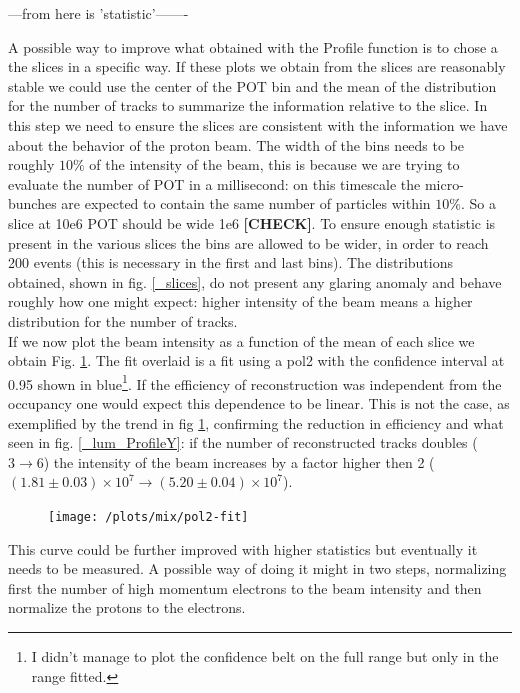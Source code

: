 \documentclass[12pt,a4paper,openright, oneside, titlepage]{book} %
\begin{document}
\vspace{2cm}
---from here is 'statistic'-------
\vspace{2cm}

\noindent A possible way to improve what obtained with the Profile function is to chose a the slices in a specific way. If these plots we obtain from the slices are reasonably stable we could use the center of the POT bin and the mean of the distribution for the number of tracks to summarize the information relative to the slice. 
In this step we need to ensure the slices are consistent with the information we have about the behavior of the proton beam.
The width of the bins needs to be roughly $10\%$ of the intensity of the beam, this is because we are trying to evaluate the number of POT in a millisecond: on this timescale the micro-bunches are expected to contain the same number of particles within $10\%$. 
So a slice at 10e6 POT should be wide 1e6 \textbf{[CHECK]}. 
To ensure enough statistic is present in the various slices the bins are allowed to be wider, in order to reach 200 events (this is necessary in the first and last bins).
The distributions obtained, shown in fig. \ref{_slices}, do not present any glaring anomaly and behave roughly how one might expect: higher intensity of the beam means a higher distribution for the number of tracks.\\

\noindent If we now plot the beam intensity as a function of the mean of each slice we obtain Fig. \ref{_pol2-fit}. 
The fit overlaid is a fit using a pol2 with the confidence interval at 0.95 shown in blue\footnote{I didn't manage to plot the confidence belt on the full range but only in the range fitted.}. 
If the efficiency of reconstruction was independent from the occupancy one would expect this dependence to be linear. 
This is not the case, as exemplified by the trend in fig \ref{_pol2-fit}, confirming the reduction in efficiency and what seen in fig. \ref{_lum_ProfileY}: if the number of reconstructed tracks doubles ($3\rightarrow6$) the intensity of the beam increases by a factor higher then 2 ($(1.81 \pm 0.03)\times 10^7 \rightarrow (5.20 \pm 0.04)\times 10^7$).

\begin{figure}[!htb]
\centering
\texttt{[image: /plots/mix/pol2-fit]}
\caption[Mean of the gaussian fit for of tracks per beam intensity]
{}
\label{_pol2-fit}
\end{figure}

\noindent This curve could be further improved with higher statistics but eventually it needs to be measured.
A possible way of doing it might in two steps, normalizing first the number of high momentum electrons to the beam intensity and then normalize the protons to the electrons.
 
\end{document}
